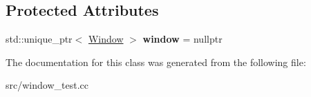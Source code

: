 \subsection*{Protected Attributes}
\begin{DoxyCompactItemize}
\item 
\hypertarget{class_window_test_a8c67ca4e0a784fc94b90c24a0d65ab82}{}\label{class_window_test_a8c67ca4e0a784fc94b90c24a0d65ab82} 
std\+::unique\+\_\+ptr$<$ \hyperlink{classae_1_1_window}{Window} $>$ {\bfseries window} = nullptr
\end{DoxyCompactItemize}


The documentation for this class was generated from the following file\+:\begin{DoxyCompactItemize}
\item 
src/window\+\_\+test.\+cc\end{DoxyCompactItemize}
